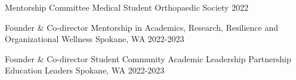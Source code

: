 


\begin{cvhonors}

  \cvhonor
    {Mentorship Committee} %
    {Medical Student Orthopaedic Society} %
    {2022} %

  \cvhonor
    {Founder \& Co-director} %
    {Mentorship in Academics, Research, Resilience and Organizational Wellness} %
    {Spokane, WA} %
    {2022-2023} %


  \cvhonor
    {Founder \& Co-director} %
    {Student Community Academic Leadership Partnership Education Leaders} %
    {Spokane, WA} %
    {2022-2023} %

\end{cvhonors}
